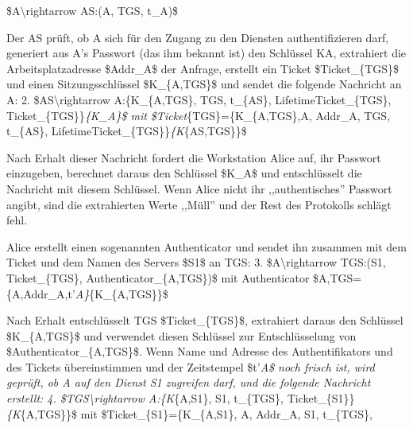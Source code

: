 \documentclass[a4paper]{article}
\begin{document}
\begin{multicols}{3}
\begin{itemize*}
            \begin{enumerate*}
                  \def\labelenumi{\arabic{enumi}.}
                  \item \$A\textbackslash rightarrow AS:(A, TGS, t\_A)\$
            \end{enumerate*}
            \item
            Der AS prüft, ob A sich für den Zugang zu den Diensten
            authentifizieren darf, generiert aus A's Passwort (das ihm bekannt
            ist) den Schlüssel KA, extrahiert die Arbeitsplatzadresse \$Addr\_A\$
            der Anfrage, erstellt ein Ticket \$Ticket\_\{TGS\}\$ und einen
            Sitzungsschlüssel \$K\_\{A,TGS\}\$ und sendet die folgende Nachricht
            an A: 2. \$AS\textbackslash rightarrow A:\{K\_\{A,TGS\}, TGS,
            t\_\{AS\}, LifetimeTicket\_\{TGS\}, Ticket\_\{TGS\}\}\emph{\{K\_A\}\$
                  mit \$Ticket}\{TGS\}=\{K\_\{A,TGS\},A, Addr\_A, TGS, t\_\{AS\},
            LifetimeTicket\_\{TGS\}\}\emph{\{K}\{AS,TGS\}\}\$
            \item
            Nach Erhalt dieser Nachricht fordert die Workstation Alice auf, ihr
            Passwort einzugeben, berechnet daraus den Schlüssel \$K\_A\$ und
            entschlüsselt die Nachricht mit diesem Schlüssel. Wenn Alice nicht ihr
            ,,authentisches'' Passwort angibt, sind die extrahierten Werte
            ,,Müll'' und der Rest des Protokolls schlägt fehl.
            \item
            Alice erstellt einen sogenannten Authenticator und sendet ihn zusammen
            mit dem Ticket und dem Namen des Servers \$S1\$ an TGS: 3.
            \$A\textbackslash rightarrow TGS:(S1, Ticket\_\{TGS\},
            Authenticator\_\{A,TGS\})\$ mit Authenticator
            \$A,TGS=\{A,Addr\_A,t'\emph{A\}}\{K\_\{A,TGS\}\}\$
            \item
            Nach Erhalt entschlüsselt TGS \$Ticket\_\{TGS\}\$, extrahiert daraus
            den Schlüssel \$K\_\{A,TGS\}\$ und verwendet diesen Schlüssel zur
            Entschlüsselung von \$Authenticator\_\{A,TGS\}\$. Wenn Name und
            Adresse des Authentifikators und des Tickets übereinstimmen und der
            Zeitstempel \$t'\emph{A\$ noch frisch ist, wird geprüft, ob A auf den
                  Dienst S1 zugreifen darf, und die folgende Nachricht erstellt: 4.
                  \$TGS\textbackslash rightarrow A:\{K}\{A,S1\}, S1, t\_\{TGS\},
            Ticket\_\{S1\}\}\emph{\{K}\{A,TGS\}\}\$ mit
            \$Ticket\_\{S1\}=\{K\_\{A,S1\}, A, Addr\_A, S1, t\_\{TGS\},

\end{itemize*}
\end{multicols}
\end{document}
